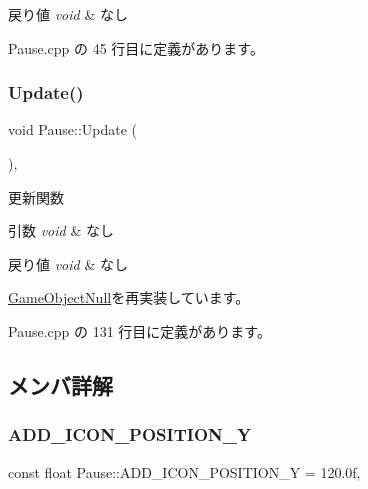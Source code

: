 \begin{DoxyRetVals}{戻り値}
{\em void} & なし \\
\hline
\end{DoxyRetVals}


 Pause.\+cpp の 45 行目に定義があります。

\mbox{\label{class_pause_aeb1d068bcff8e32feea81945e2202141}} 
\subsubsection{\texorpdfstring{Update()}{Update()}}
{\footnotesize\ttfamily void Pause\+::\+Update (\begin{DoxyParamCaption}{ }\end{DoxyParamCaption})\hspace{0.3cm}{\ttfamily [override]}, {\ttfamily [virtual]}}



更新関数 


\begin{DoxyParams}{引数}
{\em void} & なし \\
\hline
\end{DoxyParams}

\begin{DoxyRetVals}{戻り値}
{\em void} & なし \\
\hline
\end{DoxyRetVals}


\mbox{\hyperlink{class_game_object_null_aeeb51b7e7aa41fd0b16f8f7c016bdb55}{Game\+Object\+Null}}を再実装しています。



 Pause.\+cpp の 131 行目に定義があります。



\subsection{メンバ詳解}
\mbox{\label{class_pause_a9a4d0e76c041957420854824cb1bc042}} 
\subsubsection{\texorpdfstring{A\+D\+D\+\_\+\+I\+C\+O\+N\+\_\+\+P\+O\+S\+I\+T\+I\+O\+N\+\_\+Y}{ADD\_ICON\_POSITION\_Y}}
{\footnotesize\ttfamily const float Pause\+::\+A\+D\+D\+\_\+\+I\+C\+O\+N\+\_\+\+P\+O\+S\+I\+T\+I\+O\+N\+\_\+Y = 120.\+0f\hspace{0.3cm}{\ttfamily [static]}, {\ttfamily [private]}}



